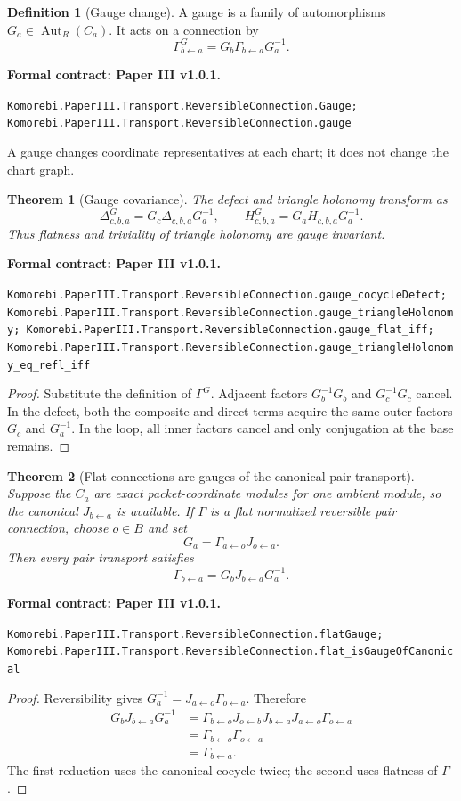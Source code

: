 \documentclass[11pt,a4paper]{article}
\newtheorem{theorem}{Theorem}[section]
\theoremstyle{plain}
\theoremstyle{definition}
\newtheorem{definition}[definition]{Definition}
\theoremstyle{remark}
\newcommand{\leanname}[1]{\nolinkurl{#1}}
\newcommand{\statusleanthree}[1]{\par\smallskip\noindent\begin{minipage}{\linewidth}{\color{leanblue}\textbf{Formal contract: Paper III v1.0.1.}}\par\begingroup\small\raggedright\leanname{#1}\par\endgroup\end{minipage}\par\smallskip}
\begin{document}
\begin{definition}[Gauge change]
\label{def:gauge-change}
A gauge is a family of automorphisms $G_a\in\operatorname{Aut}_R(C_a)$.
It acts on a connection by
\[
\Gamma^G_{b\leftarrow a}
=
G_b\Gamma_{b\leftarrow a}G_a^{-1}.
\]
\end{definition}
\statusleanthree{Komorebi.PaperIII.Transport.ReversibleConnection.Gauge; Komorebi.PaperIII.Transport.ReversibleConnection.gauge}

A gauge changes coordinate representatives at each chart; it does not change
the chart graph.

\begin{theorem}[Gauge covariance]
\label{thm:gauge-covariance}
The defect and triangle holonomy transform as
\[
\Delta^G_{c,b,a}
=G_c\Delta_{c,b,a}G_a^{-1},
\qquad
H^G_{c,b,a}
=G_aH_{c,b,a}G_a^{-1}.
\]
Thus flatness and triviality of triangle holonomy are gauge invariant.
\end{theorem}
\statusleanthree{Komorebi.PaperIII.Transport.ReversibleConnection.gauge_cocycleDefect; Komorebi.PaperIII.Transport.ReversibleConnection.gauge_triangleHolonomy; Komorebi.PaperIII.Transport.ReversibleConnection.gauge_flat_iff; Komorebi.PaperIII.Transport.ReversibleConnection.gauge_triangleHolonomy_eq_refl_iff}

\begin{proof}
Substitute the definition of $\Gamma^G$.  Adjacent factors
$G_b^{-1}G_b$ and $G_c^{-1}G_c$ cancel.  In the defect, both the composite
and direct terms acquire the same outer factors $G_c$ and $G_a^{-1}$.  In
the loop, all inner factors cancel and only conjugation at the base remains.
\end{proof}

\begin{theorem}[Flat connections are gauges of the canonical pair transport]
\label{thm:flat-gauge-canonical}
Suppose the $C_a$ are exact packet-coordinate modules for one ambient module,
so the canonical $J_{b\leftarrow a}$ is available.  If $\Gamma$ is a flat
normalized reversible pair connection, choose $o\in B$ and set
\[
G_a=\Gamma_{a\leftarrow o}J_{o\leftarrow a}.
\]
Then every pair transport satisfies
\[
\boxed{
\Gamma_{b\leftarrow a}
=G_bJ_{b\leftarrow a}G_a^{-1}.
}
\]
\end{theorem}
\statusleanthree{Komorebi.PaperIII.Transport.ReversibleConnection.flatGauge; Komorebi.PaperIII.Transport.ReversibleConnection.flat_isGaugeOfCanonical}

\begin{proof}
Reversibility gives
$G_a^{-1}=J_{a\leftarrow o}\Gamma_{o\leftarrow a}$.  Therefore
\[
\begin{aligned}
G_bJ_{b\leftarrow a}G_a^{-1}
&=
\Gamma_{b\leftarrow o}
J_{o\leftarrow b}J_{b\leftarrow a}
J_{a\leftarrow o}
\Gamma_{o\leftarrow a}\\
&=
\Gamma_{b\leftarrow o}\Gamma_{o\leftarrow a}\\
&=
\Gamma_{b\leftarrow a}.
\end{aligned}
\]
The first reduction uses the canonical cocycle twice; the second uses
flatness of $\Gamma$.
\end{proof}
\end{document}
